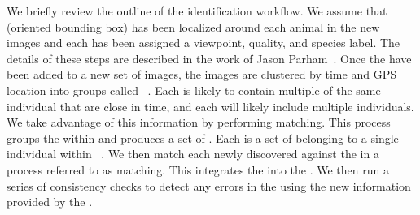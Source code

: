     We briefly review the outline of the identification workflow.
    We assume that \aan{\annot{}} (oriented bounding box) has been localized
      around each animal in the new images and each \annot{} has been assigned a
      viewpoint, quality, and species label.
    The details of these steps are described in the work of Jason
      Parham~\cite{parham_photographic_2015}.
    Once the \annots{} have been added to a new set of images, the images are
      clustered by time and GPS location into groups called
      \glossterm{\occurrences{}}~\cite{wieczorek_darwin_2012}.
    Each \occurrence{} is likely to contain multiple \annots{} of the same
      individual that are close in time, and each \occurrence{} will likely
      include multiple individuals.
    We take advantage of this information by performing
      \glossterm{\intraoccurrence{}} matching.
    This process groups the \annots{} within \aan{\occurrence{}} and produces
      a set of \encounters{}.
    Each \glossterm{\encounter{}} is a set of \annots{} belonging to a single
      individual within \aan{\occurrence{}}~\cite{j_bonner_markrecapture_2013}.
    We then match each newly discovered \encounter{} against the
      \masterdatabase{} in a process referred to as \glossterm{\vsexemplar{}}
      matching.
    This integrates the \occurrence{} into the \masterdatabase{}.
    We then run a series of consistency checks to detect any errors in the
      \masterdatabase{} using the new information provided by the \occurrence{}.

